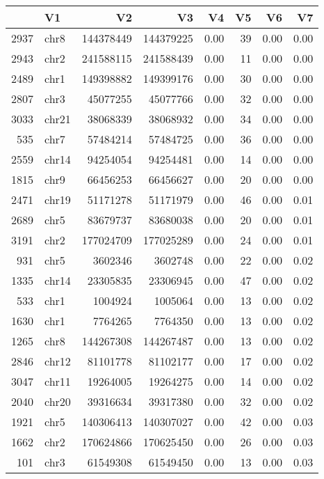 \begin{table}[ht]
\centering
\begin{tabular}{rlrrrrrr}
  \hline
 & V1 & V2 & V3 & V4 & V5 & V6 & V7 \\ 
  \hline
2937 & chr8 & 144378449 & 144379225 & 0.00 &  39 & 0.00 & 0.00 \\ 
  2943 & chr2 & 241588115 & 241588439 & 0.00 &  11 & 0.00 & 0.00 \\ 
  2489 & chr1 & 149398882 & 149399176 & 0.00 &  30 & 0.00 & 0.00 \\ 
  2807 & chr3 & 45077255 & 45077766 & 0.00 &  32 & 0.00 & 0.00 \\ 
  3033 & chr21 & 38068339 & 38068932 & 0.00 &  34 & 0.00 & 0.00 \\ 
  535 & chr7 & 57484214 & 57484725 & 0.00 &  36 & 0.00 & 0.00 \\ 
  2559 & chr14 & 94254054 & 94254481 & 0.00 &  14 & 0.00 & 0.00 \\ 
  1815 & chr9 & 66456253 & 66456627 & 0.00 &  20 & 0.00 & 0.00 \\ 
  2471 & chr19 & 51171278 & 51171979 & 0.00 &  46 & 0.00 & 0.01 \\ 
  2689 & chr5 & 83679737 & 83680038 & 0.00 &  20 & 0.00 & 0.01 \\ 
  3191 & chr2 & 177024709 & 177025289 & 0.00 &  24 & 0.00 & 0.01 \\ 
  931 & chr5 & 3602346 & 3602748 & 0.00 &  22 & 0.00 & 0.02 \\ 
  1335 & chr14 & 23305835 & 23306945 & 0.00 &  47 & 0.00 & 0.02 \\ 
  533 & chr1 & 1004924 & 1005064 & 0.00 &  13 & 0.00 & 0.02 \\ 
  1630 & chr1 & 7764265 & 7764350 & 0.00 &  13 & 0.00 & 0.02 \\ 
  1265 & chr8 & 144267308 & 144267487 & 0.00 &  13 & 0.00 & 0.02 \\ 
  2846 & chr12 & 81101778 & 81102177 & 0.00 &  17 & 0.00 & 0.02 \\ 
  3047 & chr11 & 19264005 & 19264275 & 0.00 &  14 & 0.00 & 0.02 \\ 
  2040 & chr20 & 39316634 & 39317380 & 0.00 &  32 & 0.00 & 0.02 \\ 
  1921 & chr5 & 140306413 & 140307027 & 0.00 &  42 & 0.00 & 0.03 \\ 
  1662 & chr2 & 170624866 & 170625450 & 0.00 &  26 & 0.00 & 0.03 \\ 
  101 & chr3 & 61549308 & 61549450 & 0.00 &  13 & 0.00 & 0.03 \\ 

\end{tabular}
\end{table}
